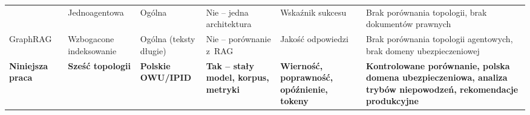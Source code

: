 \begin{table}
\begin{tabularx}{0.95\textheight}{@{} p{2.8cm} p{2.8cm} p{3.5cm} p{3.5cm} p{3.5cm} X @{}}
     & Jednoagentowa                                                      & Ogólna
     & Nie -- jedna architektura                                          & Wskaźnik sukcesu
     & Brak porównania topologii, brak dokumentów prawnych                                            \\
    \addlinespace
    GraphRAG~\cite{edge2024local}
     & Wzbogacone indeksowanie                                            & Ogólna (teksty długie)
     & Nie -- porównanie z~RAG                                            & Jakość odpowiedzi
     & Brak porównania topologii agentowych, brak domeny ubezpieczeniowej                             \\
    \addlinespace
    \rowcolor{violet!6}
    \textbf{Niniejsza praca}
     & \textbf{Sześć topologii}                                           & \textbf{Polskie OWU/IPID}
     & \textbf{Tak -- stały model, korpus, metryki}
     & \textbf{Wierność, poprawność, opóźnienie, tokeny}
     & \textbf{Kontrolowane porównanie, polska domena ubezpieczeniowa,
         analiza trybów niepowodzeń, rekomendacje produkcyjne}                                 \\
    \bottomrule
  \end{tabularx}
\end{table}
